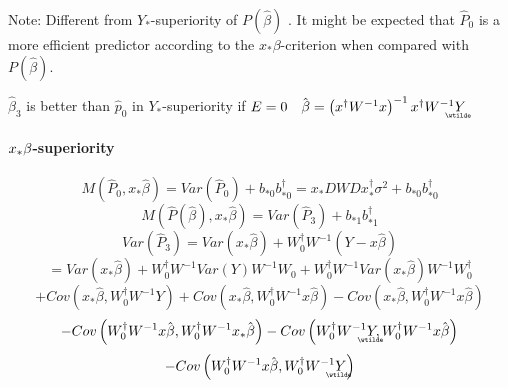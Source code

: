 \documentclass{article}
\begin{document}
\bigskip

Note: Different from $Y_{\ast }$-superiority of $P\left( \hat{\beta}\right) $%
. It might be expected that $\hat{P}_{0}$ is a more efficient predictor
according to the $x_{\ast }\beta $-criterion when compared with $P\left( 
\hat{\beta}\right) $.

$\hat{\beta}_{3}$ is better than $\hat{p}_{0}$ in $Y_{\ast }$-superiority if 
$E=0\quad \hat{\beta}=\left( x^{\dagger }W^{-1}x\right) ^{-1}x^{\dagger
}W^{-1}%
\underaccent{\wtilde}{Y}%
$

\bigskip

\paragraph{$x_{\ast }\protect\beta $-superiority}

\begin{equation*}
M\left( \hat{P}_{0},x_{\ast }\hat{\beta}\right) =Var\left( \hat{P}%
_{0}\right) +b_{\ast 0}b_{\ast 0}^{\dagger }=x_{\ast }DWDx_{\ast }^{\dagger
}\sigma ^{2}+b_{\ast 0}b_{\ast 0}^{\dagger }
\end{equation*}%
\begin{equation*}
M\left( \hat{P}\left( \hat{\beta}\right) ,x_{\ast }\hat{\beta}\right)
=Var\left( \hat{P}_{3}\right) +b_{\ast 1}b_{\ast 1}^{\dagger }
\end{equation*}%
\begin{equation*}
Var\left( \hat{P}_{3}\right) =Var\left( x_{\ast }\hat{\beta}\right)
+W_{0}^{\dagger }W^{-1}\left( Y-x\hat{\beta}\right) 
\end{equation*}%
\begin{equation*}
=Var\left( x_{\ast }\hat{\beta}\right) +W_{0}^{\dagger }W^{-1}Var\left(
Y\right) W^{-1}W_{0}+W_{0}^{\dagger }W^{-1}Var\left( x_{\ast }\hat{\beta}%
\right) W^{-1}W_{0}^{\dagger }
\end{equation*}%
\begin{equation*}
+Cov\left( x_{\ast }\hat{\beta},W_{0}^{\dagger }W^{-1}Y\right) +Cov\left(
x_{\ast }\hat{\beta},W_{0}^{\dagger }W^{-1}x\hat{\beta}\right) -Cov\left(
x_{\ast }\hat{\beta},W_{0}^{\dagger }W^{-1}x\hat{\beta}\right) 
\end{equation*}%
\begin{equation*}
-Cov\left( W_{0}^{\dagger }W^{-1}x\hat{\beta},W_{0}^{\dagger }W^{-1}x_{\ast }%
\hat{\beta}\right) -Cov\left( W_{0}^{\dagger }W^{-1}%
\underaccent{\wtilde}{Y}%
,W_{0}^{\dagger }W^{-1}x\hat{\beta}\right) 
\end{equation*}%
\begin{equation*}
-Cov\left( W_{0}^{\dagger }W^{-1}x\hat{\beta},W_{0}^{\dagger }W^{-1}%
\underaccent{\wtilde}{Y}%
\right) 
\end{equation*}
\end{document}
